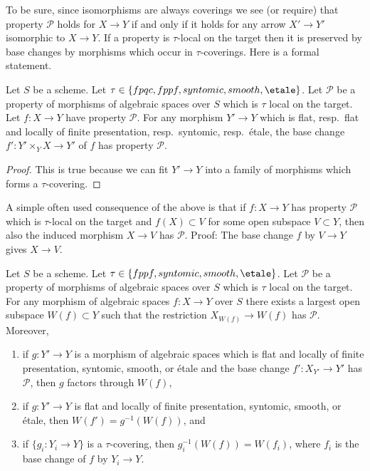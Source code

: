 \noindent
To be sure, since isomorphisms are always coverings
we see (or require) that property $\mathcal{P}$ holds for $X \to Y$
if and only if it holds for any arrow $X' \to Y'$ isomorphic to $X \to Y$.
If a property is $\tau$-local on the target then it is preserved
by base changes by morphisms which occur in $\tau$-coverings. Here
is a formal statement.

\begin{lemma}
\label{lemma-pullback-property-local-target}
Let $S$ be a scheme.
Let $\tau \in \{fpqc, fppf, syntomic, smooth, \etale\}$.
Let $\mathcal{P}$ be a property of morphisms of algebraic spaces over $S$
which is $\tau$ local on the target. Let $f : X \to Y$ have property
$\mathcal{P}$. For any morphism $Y' \to Y$ which is
flat, resp.\ flat and locally of finite presentation, resp.\ syntomic,
resp.\ \'etale, the base change
$f' : Y' \times_Y X \to Y'$ of $f$ has property $\mathcal{P}$.
\end{lemma}

\begin{proof}
This is true because we can fit $Y' \to Y$ into a family of
morphisms which forms a $\tau$-covering.
\end{proof}

\noindent
A simple often used consequence of the above is that if
$f : X \to Y$ has property $\mathcal{P}$ which is $\tau$-local
on the target and $f(X) \subset V$
for some open subspace $V \subset Y$, then also the induced
morphism $X \to V$ has $\mathcal{P}$. Proof: The base change
$f$ by $V \to Y$ gives $X \to V$.

\begin{lemma}
\label{lemma-largest-open-of-the-base}
Let $S$ be a scheme.
Let $\tau \in \{fppf, syntomic, smooth, \etale\}$.
Let $\mathcal{P}$ be a property of morphisms of algebraic spaces over $S$
which is $\tau$ local on the target. For any morphism of algebraic spaces
$f : X \to Y$ over $S$ there exists a largest open subspace
$W(f) \subset Y$ such that the restriction $X_{W(f)} \to W(f)$ has
$\mathcal{P}$. Moreover,
\begin{enumerate}
\item if $g : Y' \to Y$ is a morphism of algebraic spaces which is
flat and locally of finite presentation, syntomic, smooth, or \'etale
and the base change $f' : X_{Y'} \to Y'$ has $\mathcal{P}$, then
$g$ factors through $W(f)$,
\item if $g : Y' \to Y$ is flat and locally of finite presentation,
syntomic, smooth, or \'etale, then $W(f') = g^{-1}(W(f))$, and
\item if $\{g_i : Y_i \to Y\}$ is a $\tau$-covering, then
$g_i^{-1}(W(f)) = W(f_i)$, where $f_i$ is the base change of $f$
by $Y_i \to Y$.
\end{enumerate}
\end{lemma}

